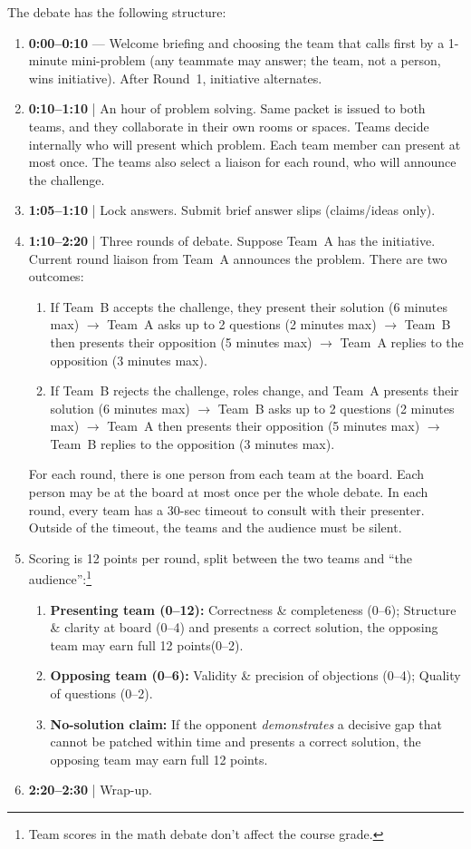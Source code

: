\documentclass[oneside,11pt]{amsart}
\begin{document}
The debate has the following structure:
\begin{enumerate}[$\bullet$]
\item \textbf{0:00--0:10} --- Welcome briefing and choosing the 
team that calls first by
a
1-minute mini-problem (any teammate may answer; the team, not a person, wins initiative). After Round~1, initiative alternates.

\item \textbf{0:10--1:10} | An hour of problem solving. Same packet 
is issued to both teams, and they collaborate in their own rooms or spaces.
Teams decide internally who will present which problem. 
Each team member can present at most once.
The teams also select a liaison for each round, who will announce the challenge.

\item \textbf{1:05--1:10} | Lock answers. Submit brief answer slips (claims/ideas only).

\item \textbf{1:10--2:20} |
Three rounds of debate.
Suppose Team~A has the initiative.
Current round liaison from Team~A
announces the problem.
There are two outcomes:
\begin{enumerate}
\item If Team~B accepts the challenge, they present their solution
(6 minutes max) $\to$
Team~A asks up to 2 questions (2 minutes max)
$\to$
Team~B then presents their opposition (5 minutes max)
$\to$
Team~A replies to the opposition (3 minutes max).
\item If Team~B rejects the challenge, roles change, and Team~A presents their solution (6 minutes max) $\to$
Team~B asks up to 2 questions (2 minutes max)
$\to$
Team~A then presents their opposition (5 minutes max)
$\to$
Team~B replies to the opposition (3 minutes max).
\end{enumerate}
For each round, there is one person from each team at the board. Each person
may be at the board at most once per the whole debate.
In each round, every team has a 30-sec timeout to consult with their presenter. Outside of the timeout, the teams and the audience must be silent.

\item Scoring is 12 points per round,
split between the two teams and ``the audience'':\footnote{Team scores 
in the math debate
don't affect the course grade.}
\begin{enumerate}
\item \textbf{Presenting team (0--12):} Correctness \& completeness (0--6); 
  Structure \& clarity at board (0--4) and presents a correct solution, the opposing team may earn full 12 points(0--2).
  \item \textbf{Opposing team (0--6):} Validity \& precision of objections (0--4);
  Quality of questions (0--2).
  \item \textbf{No-solution claim:} If the opponent \emph{demonstrates} a decisive gap that cannot be patched within time and presents a correct solution, the opposing team may earn full 12 points.
\end{enumerate}

\item \textbf{2:20--2:30} | Wrap-up.
\end{enumerate}
\end{document}
